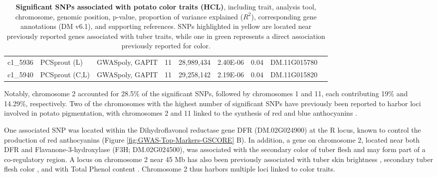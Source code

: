 \documentclass[pdflatex,sn-mathphys-ay]{sn-jnl}%
\begin{document}
\begin{landscape}
\begin{table}[]
\begin{tabular}{lllllllll}
c1\_5936                         & PCSprout (L)                            & GWASpoly, GAPIT                 & 11                       & 28,989,434                        & 2.40E-06                        & 0.04                        & DM.11G015780                        &                                                                              \\
c1\_5940                         & PCSprout (C,L)                          & GWASpoly, GAPIT                 & 11                       & 29,258,142                        & 2.19E-06                        & 0.04                        & DM.11G015820                        &       \\                                                                \hline      
\end{tabular}

\caption{\textbf{Significant SNPs associated with potato color traits (HCL)}, including trait, analysis tool, chromosome, genomic position, p-value, proportion of variance explained ($R^2$), corresponding gene annotations (DM v6.1), and supporting references. SNPs highlighted in yellow are located near previously reported genes associated with tuber traits, while one in green represents a direct association previously reported for color. }
    \label{tabsnps}
\end{table}
\end{landscape}


Notably, chromosome 2 accounted for 28.5\% of the significant SNPs, followed by chromosomes 1 and 11, each contributing 19\% and 14.29\%, respectively. Two of the chromosomes with the highest number of significant SNPs have previously been reported to harbor loci involved in potato pigmentation, with chromosomes 2 and 11 linked to the synthesis of red and blue anthocyanins \citep{van1993identification,riveros2022uncovering}.

 










One associated SNP was located within the Dihydroflavonol reductase gene DFR (DM.02G024900) at the R locus,  known to control the production of red anthocyanins\citep{de2003allele,riveros2022uncovering} (Figure \ref{fig:GWAS-Top-Markers-GSCORE} B). In addition, a gene on chromosome 2, located near both DFR and Flavanone-3-hydroxylase (F3H; DM.02G024500), was associated with the secondary color of tuber flesh and may form part of a co-regulatory region. A locus on chromosome 2 near 45 Mb has also been previously associated with tuber skin brightness \citep{sharma2024genotyping}, secondary tuber flesh color \citep{Berdugo2017}, and with Total Phenol content \citep{berdugo2023phenotypic}. Chromosome 2 thus harbors multiple loci linked to color traits.
\end{document}
